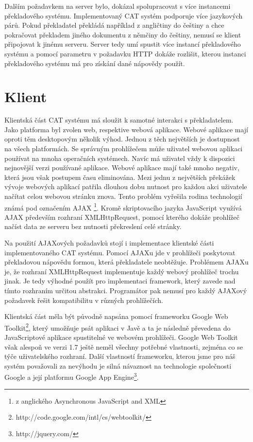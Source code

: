 \documentclass[12pt,a4paper]{report}
\begin{document}
Dalším požadavkem na server bylo, dokázal spolupracovat s více instancemi překladového systému. Implementovaný CAT systém podporuje více jazykových párů. Pokud překladatel překládá například z angličtiny do češtiny a chce pokračovat překladem jiného dokumentu z němčiny do češtiny, nemusí se klient připojovat k jinému serveru. Server tedy umí spustit více instancí překladového systému a pomocí parametru v požadavku HTTP dokáže rozlišit, kterou instanci překladového systému má pro získání dané nápovědy použít.

\section{Klient}
Klientská část CAT systému má sloužit k samotné interakci s překladatelem. Jako platforma byl zvolen web, respektive webová aplikace. Webové aplikace mají oproti těm desktopovým několik výhod. Jednou z těch největších je dostupnost na všech platformách. Se správným prohlížečem může uživatel webovou aplikaci používat na mnoha operačních systémech. Navíc má uživatel vždy k dispozici nejnovější verzi používané aplikace. Webové aplikace mají také mnoho negativ, která jsou však postupem času eliminována. Mezi jednu z největších překážek vývoje webových aplikací patřila dlouhou dobu nutnost pro každou akci uživatele načítat celou webovou stránku znova. Tento problém vyřešila rodina technologií známá pod označením AJAX \footnote{z anglického Asynchronous JavaScript and XML}. Kromě skriptovacího jazyka JavaScript využívá AJAX především rozhraní XMLHttpRequest, pomocí kterého dokáže prohlížeč načíst data ze serveru bez nutnosti překreslení celé stránky.

Na použití AJAXových požadavků stojí i implementace klientské části implementovaného CAT systému. Pomocí AJAXu jde v prohlížeči poskytovat překladovou nápovědu formou, která překladatele neobtěžuje. Problémem AJAXu je, že rozhraní XMLHttpRequest implementuje každý webový prohlížeč trochu jinak. Je tedy výhodné použít pro implementaci framework, který zavede nad tímto rozhraním určitou abstrakci. Programátor pak nemusí pro každý AJAXový požadavek řešit kompatibilitu v různých prohlížečích.

Klientská část měla být původně napsána pomocí frameworku Google Web Toolkit\footnote{http://code.google.com/intl/cs/webtoolkit/}, který umožňuje psát aplikaci v Javě a ta je následně převedena do JavaScriptové aplikace spustitelné ve webovém prohlížeči. Google Web Toolkit však alespoň ve verzi 1.7 ještě neměl všechny potřebné vlastnosti, zejména co se týče uživatelského rozhraní. Další vlastností frameworku, kterou jsme pro náš systém považovali za nevýhodu je silná návaznost na technologie společnosti Google a její platformu Google App Engine\footnote{http://jquery.com/}.
\end{document}
